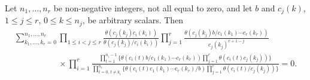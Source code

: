 \begin{Lemma}\label{cfg}
Let $n_1,\dots,n_r$ be non-negative integers, not all equal to zero,
and let $b$ and
$c_j(k)$, $1\leq j\leq r$, $0\leq k\leq n_j$, be arbitrary scalars.
Then
\begin{gather*}
\sum_{k_1,\dots,k_r=0}^{n_1,\dots,n_r}
\prod\limits_{1\leq i<j\leq r}\frac{\theta(c_j(k_j)c_i(k_i))}{\theta(c_j(k_j)/c_i(k_i))}
\prod\limits_{j=1}^r\frac{\theta(c_j(k_j)b/c_1(k_1)\dotsm c_r(k_r))}{c_j(k_j)^{r+1-j}}
\\ \phantom{\sum_{k_1,\dots,k_r=0}^{n_1,\dots,n_r}}
\times\prod\limits_{i=1}^r\frac{\prod\limits_{t=1}^{n_i-1}
\bigg\{\theta(c_i(t)b/c_1(k_1)\dotsm
 c_r(k_r))\prod\limits_{j=1}^r\theta(c_i(t)c_j(k_j))\bigg\}}
{\prod\limits_{t=0,\,t\neq k_i}^{n_i}
\bigg\{\theta(c_i(t)c_1(k_1)\dotsm c_r(k_r)/b)
\prod\limits_{j=1}^r\theta(c_i(t)/c_j(k_j))\bigg\}}=0.
\end{gather*}
\end{Lemma}

